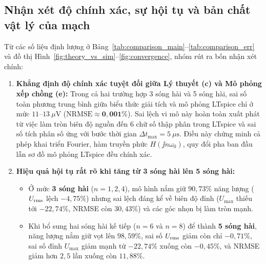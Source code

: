\subsection{Nhận xét độ chính xác, sự hội tụ và bản chất vật lý của mạch}

Từ các số liệu định lượng ở Bảng~\ref{tab:comparison_main}--\ref{tab:comparison_err} và đồ thị Hình~\ref{fig:theory_vs_sim}--\ref{fig:convergence}, nhóm rút ra bốn nhận xét chính:

\begin{enumerate}
    \item \textbf{Khẳng định độ chính xác tuyệt đối giữa Lý thuyết (c) và Mô phỏng xếp chồng (e):}
    Trong cả hai trường hợp 3 sóng hài và 5 sóng hài, sai số toàn phương trung bình giữa biểu thức giải tích và mô phỏng LTspice chỉ ở mức \textbf{$11\text{--}13\ \mu\text{V}$} ($\text{NRMSE} \approx \mathbf{0{,}001\%}$). Sai lệch vi mô này hoàn toàn xuất phát từ việc làm tròn biên độ nguồn đến 6 chữ số thập phân trong LTspice và sai số tích phân số ứng với bước thời gian $\Delta t_{\max} = 5\ \mu\text{s}$. Điều này chứng minh cả phép khai triển Fourier, hàm truyền phức $H(\jj n\omega_0)$, quy đổi pha ban đầu lẫn sơ đồ mô phỏng LTspice đều chính xác.

    \item \textbf{Hiệu quả hội tụ rất rõ khi tăng từ 3 sóng hài lên 5 sóng hài:}
    \begin{itemize}
        \item Ở mức \textbf{3 sóng hài} ($n = 1, 2, 4$), mô hình nắm giữ $90{,}73\%$ năng lượng ($U_{\text{rms}}$ lệch $-4{,}75\%$) nhưng sai lệch đáng kể về biên độ đỉnh ($U_{\max}$ thiếu tới $-22{,}74\%$, NRMSE còn $30{,}43\%$) và các góc nhọn bị làm tròn mạnh.
        \item Khi bổ sung hai sóng hài kế tiếp ($n = 6$ và $n = 8$) để thành \textbf{5 sóng hài}, năng lượng nắm giữ vọt lên \textbf{$98{,}59\%$}, sai số $U_{\text{rms}}$ giảm còn chỉ \textbf{$-0{,}71\%$}, sai số đỉnh $U_{\max}$ giảm mạnh từ $-22{,}74\%$ xuống còn \textbf{$-0{,}45\%$}, và NRMSE giảm hơn $2{,}5$ lần xuống còn \textbf{$11{,}88\%$}.
    \end{itemize}


\end{enumerate}
